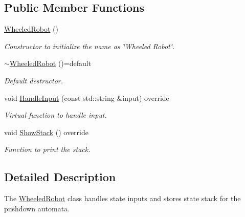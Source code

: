 \subsection*{Public Member Functions}
\begin{DoxyCompactItemize}
\item 
\mbox{\label{class_wheeled_robot_a884fb2c600eeadcc3d772eaf324bb8cd}} 
\mbox{\hyperlink{class_wheeled_robot_a884fb2c600eeadcc3d772eaf324bb8cd}{Wheeled\+Robot}} ()
\begin{DoxyCompactList}\small\item\em Constructor to initialize the name as \char`\"{}\+Wheeled Robot\char`\"{}. \end{DoxyCompactList}\item 
\mbox{\label{class_wheeled_robot_abc080e5b4fc3b3836abaceabfc47a375}} 
\mbox{\hyperlink{class_wheeled_robot_abc080e5b4fc3b3836abaceabfc47a375}{$\sim$\+Wheeled\+Robot}} ()=default
\begin{DoxyCompactList}\small\item\em Default destructor. \end{DoxyCompactList}\item 
void \mbox{\hyperlink{class_wheeled_robot_a481731d5b59ed97b432aac14de6036fd}{Handle\+Input}} (const std\+::string \&input) override
\begin{DoxyCompactList}\small\item\em Virtual function to handle input. \end{DoxyCompactList}\item 
\mbox{\label{class_wheeled_robot_afa52dc36da5f5bf885875e436ecf25b6}} 
void \mbox{\hyperlink{class_wheeled_robot_afa52dc36da5f5bf885875e436ecf25b6}{Show\+Stack}} () override
\begin{DoxyCompactList}\small\item\em Function to print the stack. \end{DoxyCompactList}\end{DoxyCompactItemize}


\subsection{Detailed Description}
The \mbox{\hyperlink{class_wheeled_robot}{Wheeled\+Robot}} class handles state inputs and stores state stack for the pushdown automata. 

